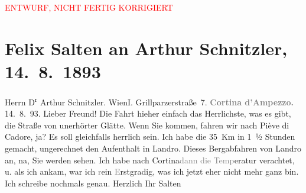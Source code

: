 
\begin{center}
            \textcolor{red}{ENTWURF, NICHT FERTIG KORRIGIERT}
                      \end{center}
            
         \renewcommand{\erwaehnteOrte}{Orte: Cortina d'Ampezzo, Grillparzerstraße, Höhlenstein, I., Innere Stadt, Pieve di Cadore, Wien}
         \renewcommand{\erwaehnteWerke}{}
               \section[Felix Salten an Arthur Schnitzler, 14. 8. 1893]{ Felix Salten an Arthur Schnitzler, 14. 8. 1893}\nopagebreak{}\rehead{ }\begin{ledgroupsized}[t]{13cm}\normalsize\beginnumbering \toendnotes[C]{\smallbreak\pagebreak[2]} 
\pstart{}{\pb}Herrn D\textsuperscript{r} Arthur Schnitzler. \pend{}\pstart{}Wien\pend{}\pstart{}I. Grillparzerstraße 7. \pend{}{\bigskip}\pstart
           \noindent{}\centering{}{\pb}\textcolor{gray}{\textbf{Cortina d’Ampezzo.}}\pend
           \pstart
           \raggedleft{}14. 8. 93. \pend
           \pstart
           Lieber Freund! Die Fahrt hieher einfach das Herrlichste, was es
               gibt, die Straße von unerhörter Glätte. Wenn Sie kommen, fahren wir nach Piève di Cadore, ja? Es soll gleichfalls
               herrlich sein. Ich habe die 35 Km in 1 ½ Stunden gemacht, ungerechnet den Aufenthalt
               in Landro. Dieses Bergabfahren von Landro an, na, Sie werden sehen. Ich habe nach Cortina\textcolor{gray}{dann die Temp}eratur verachtet, u. als ich ankam, war ich
                  \textcolor{gray}{r}ein \textcolor{gray}{E}rstgradig, was ich jetzt eher nicht
               mehr ganz bin. Ich schreibe nochmals genau. \pend
           \pstart Herzlich Ihr \spacefill\mbox{Salten}\pend{}
         
         \endnumbering{}\end{ledgroupsized}\begin{anhang}\end{anhang}\newcommand{\dateiname}{L03127}\newcommand{\titel}{Felix Salten an Arthur Schnitzler, 14. 8. 1893}\newcommand{\editorInnen}{Martin Anton Müller und Laura Untner}
      